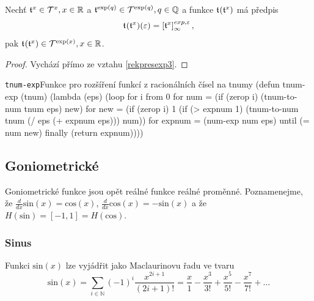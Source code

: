 \begin{consequence}\label{dusl:expotnumu}
Nechť $\mathfrak{t}^{x}\in\mathcal{T}^{x},x\in\mathbb{R}$ a $\mathfrak{t}^{\mathrm{exp}(q)}\in\mathcal{T}^{\mathrm{exp}(q)},q\in\mathbb{Q}$ a funkce $\mathfrak{t}^{}(\mathfrak{t}^{x})$ má předpis
\begin{equation}
\mathfrak{t}^{}(\mathfrak{t}^{x})(\varepsilon)=\left[\mathfrak{t}^{x}\right]_\infty^{exp,\varepsilon},
\end{equation}
pak $\mathfrak{t}^{}(\mathfrak{t}^{x})\in\mathcal{T}^{\mathrm{exp}(x)},x\in\mathbb{R}$.
\begin{proof}
Vychází přímo ze vztahu \ref{rekpresexp3}.
\end{proof}
\end{consequence}

\begin{lispcode}{\texttt{tnum-exp}}{Funkce pro rozšíření funkcí z racionálních čísel na tnumy}
(\textcolor{funkcionalni}{defun} \textcolor{pojmenovan}{tnum-exp} (tnum)
  (\textcolor{funkcionalni}{lambda} (eps)
    (\textcolor{funkcionalni}{loop} \textcolor{obarvi}{for} i \textcolor{obarvi}{from} 0
          \textcolor{obarvi}{for} num = (\textcolor{funkcionalni}{if} (\textcolor{funkcionalni}{zerop} i) (\textcolor{moje}{tnum-to-num} tnum eps) new)
          \textcolor{obarvi}{for} new = (\textcolor{funkcionalni}{if} (\textcolor{funkcionalni}{zerop} i) 1
                      (\textcolor{funkcionalni}{if} (\textcolor{matematicke}{>} expnum 1)
                          (\textcolor{moje}{tnum-to-num} tnum (\textcolor{matematicke}{/} eps 
                                               (\textcolor{matematicke}{+} expnum eps)))
                        num))
          \textcolor{obarvi}{for} expnum = (\textcolor{moje}{num-exp} num eps)
          \textcolor{obarvi}{until} (\textcolor{matematicke}{=} num new) \textcolor{obarvi}{finally} (\textcolor{funkcionalni}{return} expnum))))
\end{lispcode}

\subsection{Goniometrické}
Goniometrické funkce jsou opět reálné funkce reálné proměnné. Poznamenejme, že $\frac{d}{dx}\mathrm{sin}(x) = \mathrm{cos}(x)$, $\frac{d}{dx}\mathrm{cos}(x) = -\mathrm{sin}(x)$ a že $H(\mathrm{sin}) = [-1,1] = H(\mathrm{cos})$.

\subsubsection{Sinus}
\begin{fact}\label{vet:sin_jako_rada}
Funkci $\mathrm{sin}(x)$ lze vyjádřit jako Maclaurinovu řadu ve tvaru
\begin{equation}
\mathrm{sin}(x) =\sum_{i \in \mathbb{N}} (-1)^i \frac{x^{2i+1}}{(2i+1)!} =\frac{x}{1} - \frac{x^3}{3!} + \frac{x^5}{5!} - \frac{x^7}{7!} + \ldots
\end{equation}
\end{fact}


